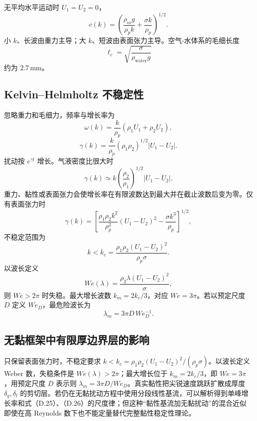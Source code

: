 \documentclass[11pt,a4paper,openany,fontset=none]{ctexbook}
\begin{document}
无平均水平运动时 $U_1=U_2=0$，
\begin{equation}
 c(k)=\left(\frac{\rho_mg}{\rho_pk}+\frac{\sigma k}{\rho_p}\right)^{1/2}. \tag{D.17}
\end{equation}
小 $k$、长波由重力主导；大 $k$、短波由表面张力主导。空气-水体系的毛细长度
\begin{equation*}
 \ell_c=\sqrt{\frac{\sigma}{\rho_{\mathrm{water}}g}}
\end{equation*}
约为 $2.7\,\mathrm{mm}$。

\subsection{Kelvin--Helmholtz 不稳定性}

忽略重力和毛细力，频率与增长率为
\begin{equation}
 \omega(k)=\frac{k}{\rho_p}(\rho_1U_1+\rho_2U_2), \tag{D.18}
\end{equation}
\begin{equation}
 \gamma(k)=\frac{k}{\rho_p}(\rho_1\rho_2)^{1/2}|U_1-U_2|. \tag{D.19}
\end{equation}
扰动按 $e^{\gamma t}$ 增长。气液密度比很大时
\begin{equation}
 \gamma(k)\simeq k\left(\frac{\rho_2}{\rho_1}\right)^{1/2}|U_1-U_2|. \tag{D.20}
\end{equation}
重力、黏性或表面张力会使增长率在有限波数达到最大并在截止波数后变为零。仅有表面张力时
\begin{equation}
 \gamma(k)=\left[
 \frac{\rho_1\rho_2k^2}{\rho_p^2}(U_1-U_2)^2-
 \frac{\sigma k^3}{\rho_p}
 \right]^{1/2}, \tag{D.21}
\end{equation}
不稳定范围为
\begin{equation}
 k<k_c=\frac{\rho_1\rho_2(U_1-U_2)^2}{\rho_p\sigma}. \tag{D.22}
\end{equation}
以波长定义
\begin{equation}
 We(\lambda)=\frac{\rho_2\lambda(U_1-U_2)^2}{\sigma}, \tag{D.23}
\end{equation}
则 $We>2\pi$ 时失稳。最大增长波数 $k_m=2k_c/3$，对应 $We=3\pi$。若以预定尺度 $D$ 定义 $We_D$，最危险波长为
\begin{equation}
 \lambda_m=3\pi D\,We_D^{-1}. \tag{D.24}
\end{equation}

\subsection{无黏框架中有限厚边界层的影响}
只保留表面张力时，不稳定要求 $k<k_c=\rho_1\rho_2(U_1-U_2)^2/(\rho_p\sigma)$。以波长定义 Weber 数，失稳条件是 $We(\lambda)>2\pi$；最大增长位于 $k_m=2k_c/3$，即 $We=3\pi$，用预定尺度 $D$ 表示则 $\lambda_m=3\pi D/We_D$。真实黏性把尖锐速度跳跃扩散成厚度 $\delta_g,\delta_l$ 的剪切层。若仍在无黏扰动方程中使用分段线性基流，可以解析得到单峰增长率和式（D.25）、（D.26）的尺度律；但这种“黏性基流加无黏扰动”的混合近似即使在高 Reynolds 数下也不能定量替代完整黏性稳定性理论。
\end{document}
